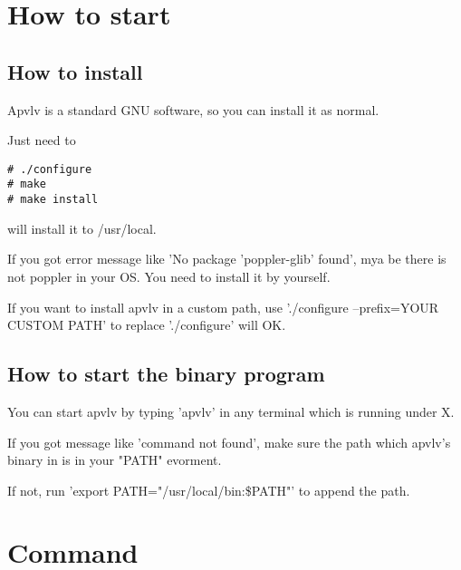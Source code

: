 \documentclass[a4paper,12pt]{article}
\begin{document}
\newpage

\section{How to start}

\subsection{How to install}

Apvlv is a standard GNU software, so you can install it as normal.

Just need to
\begin{verbatim}
# ./configure
# make
# make install
\end{verbatim}
will install it to /usr/local.

If you got error message like 'No package 'poppler-glib' found', mya be there is not poppler in your OS. You need to install it by yourself.

If you want to install apvlv in a custom path, use './configure --prefix=YOUR CUSTOM PATH' to replace './configure' will OK.

\subsection{How to start the binary program}

You can start apvlv by typing 'apvlv' in any terminal which is running under X.

If you got message like 'command not found', make sure the path which apvlv's binary in is in your "PATH" evorment. 

If not, run 'export PATH="/usr/local/bin:\$PATH"' to append the path.

\newpage

\section{Command}
\end{document}
